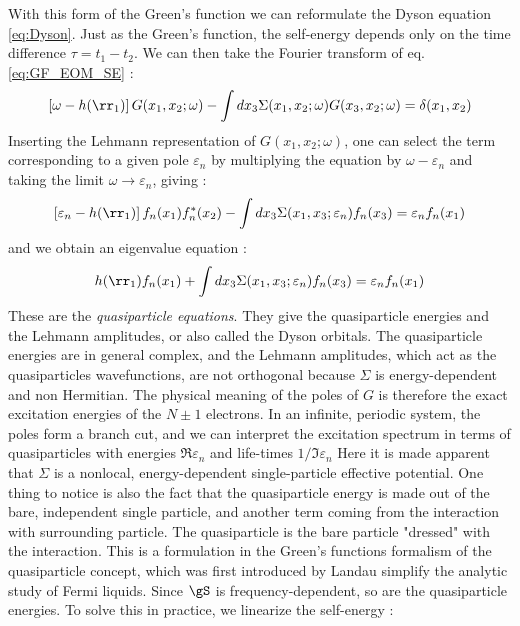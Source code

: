 With this form of the Green's function we can reformulate the Dyson equation \eqref{eq:Dyson}. Just as the Green's function, the self-energy depends only on the time difference $\tau = t_1 - t_2$. We can then take the Fourier transform of eq. \eqref{eq:GF_EOM_SE} :
\begin{equation}
	\left[ \omega - h(\rr_1) \right] G(x_1,x_2;\omega) - \int dx_3 \Sigma(x_1,x_2;\omega) G(x_3,x_2;\omega) = \delta(x_1,x_2)
\end{equation}
Inserting the Lehmann representation of $G(x_1,x_2;\omega)$, one can select the term corresponding to a given pole $\varepsilon_n$ by multiplying the equation by $\omega - \varepsilon_n$ and taking the limit $\omega \to \varepsilon_n$, giving :
\begin{equation}
	\left[ \varepsilon_n - h(\rr_1) \right] f_n(x_1)f^*_n(x_2) - \int dx_3 \Sigma(x_1,x_3;\varepsilon_n) f_n(x_3) = \varepsilon_n f_n(x_1)
\end{equation}
and we obtain an eigenvalue equation :
\begin{equation}
	h(\rr_1)f_n(x_1) + \int dx_3 \Sigma(x_1,x_3;\varepsilon_n)f_n(x_3) = \varepsilon_n f_n(x_1)
\end{equation}
These are the \textit{quasiparticle equations}. They give the quasiparticle energies and the Lehmann amplitudes, or also called the Dyson orbitals. The quasiparticle energies are in general complex, and the Lehmann amplitudes, which act as the quasiparticles wavefunctions, are not orthogonal because $\Sigma$ is energy-dependent and non Hermitian. The physical meaning of the poles of $G$ is therefore the exact excitation energies of the $N\pm1$ electrons. In an infinite, periodic system, the poles form a branch cut, and we can interpret the excitation spectrum in terms of quasiparticles with energies $\Re\varepsilon_n$ and life-times $1/\Im\varepsilon_n$
Here it is made apparent that $\Sigma$ is a nonlocal, energy-dependent single-particle effective potential. One thing to notice is also the fact that the quasiparticle energy is made out of the bare, independent single particle, and another term coming from the interaction with surrounding particle. The quasiparticle is the bare particle "dressed" with the interaction. This is a formulation in the Green's functions formalism of the quasiparticle concept, which was first introduced by Landau simplify the analytic study of Fermi liquids. \cite{landau1957oscillations}
Since $\gS$ is frequency-dependent, so are the quasiparticle energies. To solve this in practice, we linearize the self-energy :
